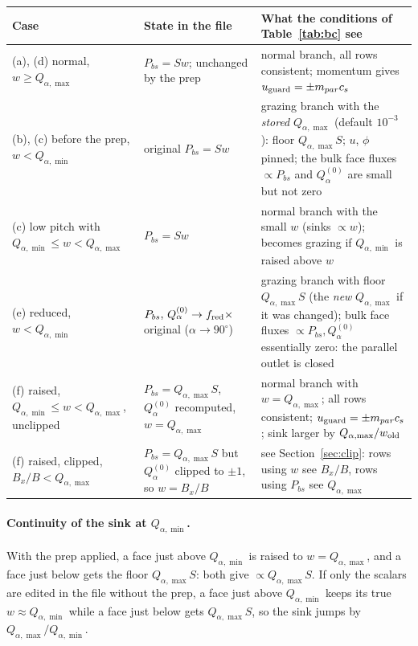 \documentclass[11pt,a4paper]{article}
\newcommand{\qalf}{Q_{\alpha}}
\newcommand{\wrk}{w}
\newcommand{\qmin}{Q_{\alpha,\min}}
\newcommand{\qmax}{Q_{\alpha,\max}}
\begin{document}
\begin{longtable}{p{3.4cm}p{3.6cm}p{7.6cm}}
\toprule
Case & State in the file & What the conditions of Table~\ref{tab:bc} see \\ \midrule
\endhead
(a), (d) normal, $\wrk\ge\qmax$ & $P_{bs}=S\wrk$; unchanged by the prep &
   normal branch, all rows consistent; momentum gives $u_{\rm guard}=\pm m_{par}c_s$ \\
(b), (c) before the prep, $\wrk<\qmin$ & original $P_{bs}=S\wrk$ &
   grazing branch with the \emph{stored} $\qmax$ (default $10^{-3}$): floor $\qmax S$; $u$, $\phi$ pinned; the bulk face fluxes
   $\propto P_{bs}$ and $\qalf^{(0)}$ are small but not zero \\
(c) low pitch with $\qmin\le\wrk<\qmax$ & $P_{bs}=S\wrk$ &
   normal branch with the small $\wrk$ (sinks $\propto\wrk$); becomes grazing if $\qmin$ is raised above $\wrk$ \\
(e) reduced, $\wrk<\qmin$ & $P_{bs},\,\qalf^{(0)}\to f_{\rm red}\times$ original ($\alpha\to90^\circ$) &
   grazing branch with floor $\qmax S$ (the \emph{new} $\qmax$ if it was changed); bulk face fluxes
   $\propto P_{bs},\qalf^{(0)}$ essentially zero: the parallel outlet is closed \\
(f) raised, $\qmin\le\wrk<\qmax$, unclipped & $P_{bs}=\qmax S$, $\qalf^{(0)}$ recomputed, $\wrk=\qmax$ &
   normal branch with $\wrk=\qmax$; all rows consistent; $u_{\rm guard}=\pm m_{par}c_s$; sink larger by $\qmax/\wrk_{\rm old}$ \\
(f) raised, clipped, $B_x/B<\qmax$ & $P_{bs}=\qmax S$ but $\qalf^{(0)}$ clipped to $\pm1$, so $\wrk=B_x/B$ &
   see Section~\ref{sec:clip}: rows using $\wrk$ see $B_x/B$, rows using $P_{bs}$ see $\qmax$ \\
\bottomrule
\end{longtable}

\paragraph{Continuity of the sink at $\qmin$.} With the prep applied, a face just above $\qmin$ is raised to
$\wrk=\qmax$, and a face just below gets the floor $\qmax S$: both give $\propto\qmax S$. If only the scalars are edited in the file
without the prep, a face just above $\qmin$ keeps its true $\wrk\approx\qmin$ while a face just below gets $\qmax S$, so the
sink jumps by $\qmax/\qmin$.
\end{document}
